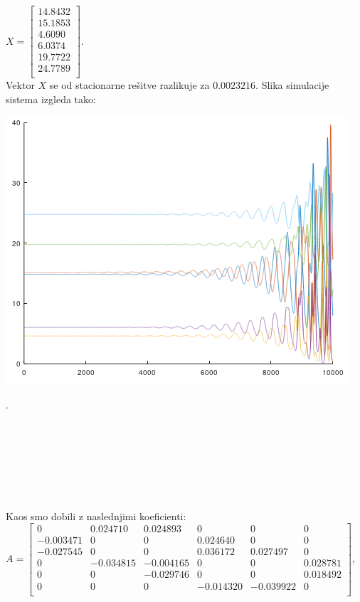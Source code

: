 \documentclass[a4paper, 12pt]{article}
\begin{document}
$ X =
\begin{bmatrix}
	14.8432 \\
	15.1853 \\
	4.6090 \\
	6.0374 \\
	19.7722 \\
	24.7789 \\
\end{bmatrix} $. \\
Vektor $ X $ se od stacionarne rešitve razlikuje za $ 0.0023216 $. Slika simulacije
sistema izgleda tako:
\begin{center}
	\includegraphics{asimptotic_cyclic_source.png}
\end{center}
.
\\
\\
\\
\\
\\
\\
\\
\\
Kaos smo dobili z naslednjimi koeficienti:\\
$ A =
\begin{bmatrix}
	0 & 0.024710 & 0.024893 & 0 & 0 & 0 \\
	-0.003471 & 0 & 0 & 0.024640 & 0 & 0 \\
	-0.027545 & 0 & 0 & 0.036172 & 0.027497 & 0 \\
	0 & -0.034815 & -0.004165 & 0 & 0 & 0.028781 \\
	0 & 0 & -0.029746 & 0 & 0 & 0.018492 \\
	0 & 0 & 0 & -0.014320 & -0.039922 & 0 \\
\end{bmatrix} $, 
\end{document}
